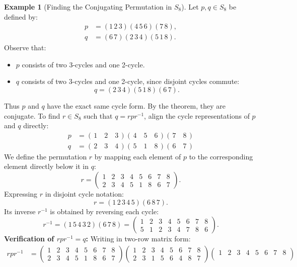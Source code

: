\documentclass[12pt]{article}
\theoremstyle{definition}
\newtheorem{example}[definition]{Example}
\theoremstyle{plain}
\begin{document}
\begin{example}[Finding the Conjugating Permutation in $S_8$]
Let $p, q \in S_8$ be defined by:
\begin{align*}
p &= (1\,2\,3)(4\,5\,6)(7\,8), \\
q &= (6\,7)(2\,3\,4)(5\,1\,8).
\end{align*}
Observe that:
\begin{itemize}
    \item $p$ consists of two 3-cycles and one 2-cycle.
    \item $q$ consists of two 3-cycles and one 2-cycle, since disjoint cycles commute:
    \[
    q = (2\,3\,4)(5\,1\,8)(6\,7).
    \]
\end{itemize}
Thus $p$ and $q$ have the exact same cycle form. By the theorem, they are conjugate. To find $r \in S_8$ such that $q = r p r^{-1}$, align the cycle representations of $p$ and $q$ directly:
\[
\begin{aligned}
p &= (\,1 \quad 2 \quad 3\,)(\,4 \quad 5 \quad 6\,)(\,7 \quad 8\,) \\
q &= (\,2 \quad 3 \quad 4\,)(\,5 \quad 1 \quad 8\,)(\,6 \quad 7\,)
\end{aligned}
\]
We define the permutation $r$ by mapping each element of $p$ to the corresponding element directly below it in $q$:
\[
r = \begin{pmatrix}
1 & 2 & 3 & 4 & 5 & 6 & 7 & 8 \\
2 & 3 & 4 & 5 & 1 & 8 & 6 & 7
\end{pmatrix}.
\]
Expressing $r$ in disjoint cycle notation:
\[
r = (1\,2\,3\,4\,5)(6\,8\,7).
\]
Its inverse $r^{-1}$ is obtained by reversing each cycle:
\[
r^{-1} = (1\,5\,4\,3\,2)(6\,7\,8) = \begin{pmatrix}
1 & 2 & 3 & 4 & 5 & 6 & 7 & 8 \\
5 & 1 & 2 & 3 & 4 & 7 & 8 & 6
\end{pmatrix}.
\]
\textbf{Verification of $r p r^{-1} = q$:}
Writing in two-row matrix form:
\begin{align*}
r p r^{-1} &= \begin{pmatrix}
1 & 2 & 3 & 4 & 5 & 6 & 7 & 8 \\
2 & 3 & 4 & 5 & 1 & 8 & 6 & 7
\end{pmatrix}
\begin{pmatrix}
1 & 2 & 3 & 4 & 5 & 6 & 7 & 8 \\
2 & 3 & 1 & 5 & 6 & 4 & 8 & 7
\end{pmatrix}
\begin{pmatrix}
1 & 2 & 3 & 4 & 5 & 6 & 7 & 8 \\

\end{pmatrix}
\end{align*}
\end{example}
\end{document}
